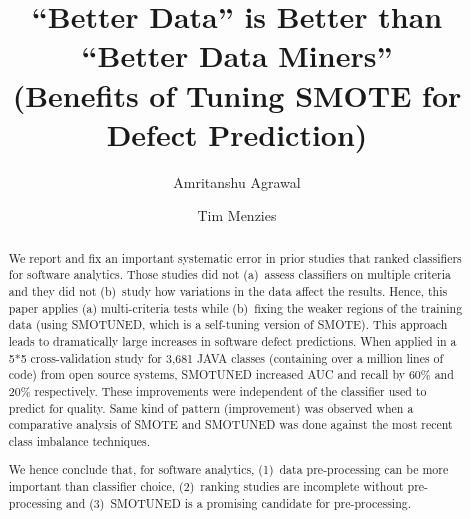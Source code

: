 \documentclass[sigconf,review, anonymous]{acmart}
\theoremstyle{break}
\theoremstyle{break}
\newcommand{\sma}{{\sc SMOTE}}
\newcommand{\smb}{{\sc SMOTUNED}}
\begin{document}
\pagestyle{plain}

\title{``Better Data'' is Better than ``Better Data Miners''\\ (Benefits of Tuning SMOTE for Defect Prediction) }



\author{Amritanshu Agrawal}

\author{Tim Menzies}

\begin{abstract}
We report and fix an important systematic error in prior
studies that ranked classifiers for software analytics.
Those studies  did  not (a)~assess classifiers on multiple   criteria
and they did not 
(b)~study  how variations in the  data affect the results. 
Hence, 
this paper applies (a)  multi-criteria tests while (b)~fixing the weaker regions of the training
 data (using {\smb}, which is a self-tuning version of {\sma}).
This approach
leads to dramatically large increases in software defect predictions.
When applied in a 5*5 cross-validation study for  3,681	JAVA classes (containing over a million lines of code) from open source  systems,
{\smb} increased
AUC and recall by 60\% and 20\% respectively. 
These improvements were independent of the classifier used to
predict for quality. Same kind of pattern (improvement) was observed when a comparative analysis of {\sma} and {\smb} was done against the most recent class imbalance techniques.

We hence conclude that, for  software analytics, (1)~data
pre-processing can be more important than  classifier
choice,
(2)~ranking studies  are  incomplete  without
 pre-processing and
(3)~{\smb} is a   promising candidate for  pre-processing.

\end{abstract}


\end{document}
